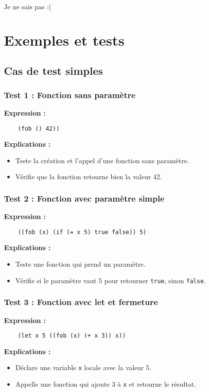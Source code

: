 \documentclass{article}
\begin{document}
Je ne sais pas :(

\newpage 
\section{Exemples et tests} 
\subsection{Cas de test simples} 
\subsubsection*{Test 1 : Fonction sans paramètre} 
\hspace{.5cm}\textbf{Expression :} 
\begin{verbatim} 
    (fob () 42)) 
\end{verbatim} 
\hspace{.5cm}\textbf{Explications :} 
\begin{itemize} 
    \item Teste la création et l'appel d'une fonction sans paramètre. 
    \item Vérifie que la fonction retourne bien la valeur 42. 
\end{itemize}
\subsubsection*{Test 2 : Fonction avec paramètre simple} 
\hspace{.5cm}\textbf{Expression :} 
\begin{verbatim} 
    ((fob (x) (if (= x 5) true false)) 5) 
\end{verbatim} 
\hspace{.5cm}\textbf{Explications :} 
\begin{itemize} 
    \item Teste une fonction qui prend un paramètre. 
    \item Vérifie si le paramètre vaut 5 pour retourner \texttt{true}, sinon \texttt{false}. 
\end{itemize}
\subsubsection*{Test 3 : Fonction avec let et fermeture} 
\hspace{.5cm}\textbf{Expression :} 
\begin{verbatim} 
    (let x 5 ((fob (x) (+ x 3)) x)) 
\end{verbatim} 
\hspace{.5cm}\textbf{Explications :} 
\begin{itemize} 
    \item Déclare une variable \texttt{x} locale avec la valeur 5. 
    \item Appelle une fonction qui ajoute 3 à \texttt{x} et retourne le résultat. 
\end{itemize}
\end{document}
